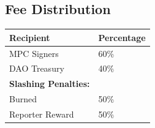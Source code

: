 \subsection{Fee Distribution}

\begin{table}[h]
\centering
\begin{tabular}{@{}ll@{}}
\toprule
\textbf{Recipient} & \textbf{Percentage} \\
\midrule
MPC Signers & 60\% \\
DAO Treasury & 40\% \\
\midrule
\textbf{Slashing Penalties:} & \\
Burned & 50\% \\
Reporter Reward & 50\% \\
\bottomrule
\end{tabular}

\label{tab:fee-dist}
\end{table}

